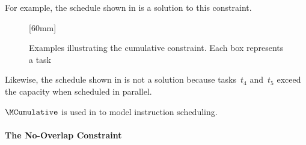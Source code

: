 For example, the schedule shown in  is a
\gls{solution} to this \gls{constraint}.
%
\begin{figure}
                {%
                }%
  \hfill%
                [60mm]%
                {%
                }

  \caption[Examples illustrating the cumulative constraint]%
          {%
            Examples illustrating the cumulative constraint.
            Each box represents a task%
          }
\end{figure}
%
Likewise, the schedule shown in  is not a
\gls{solution} because tasks~$t_4$ and~$t_5$ exceed the capacity when scheduled
in parallel.

$\MCumulative$ is used in  to model
\gls{instruction scheduling}.


\paragraph{The No-Overlap Constraint}

